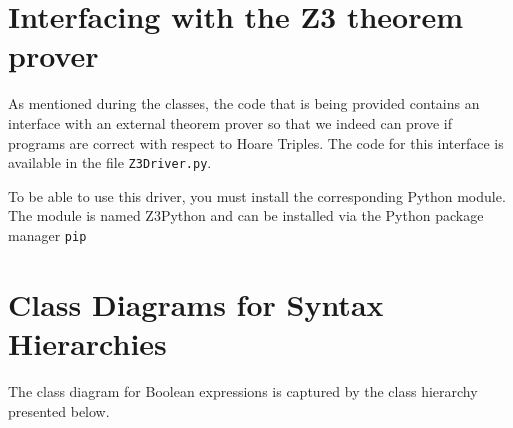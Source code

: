 \documentclass[11pt]{article}
\begin{document}
\section*{Interfacing with the Z3 theorem prover}  

As mentioned during the classes, the code that is being provided contains an interface with an external theorem prover so that we indeed can prove if programs are correct with respect to Hoare Triples. The code for this interface is available in the file \texttt{Z3Driver.py}.

To be able to use this driver, you must install the corresponding Python module. The module is named Z3Python and can be installed via the Python package manager \texttt{pip}





\section*{Class Diagrams for Syntax Hierarchies}

The class diagram for Boolean expressions is captured by the class hierarchy presented below.
\end{document}
